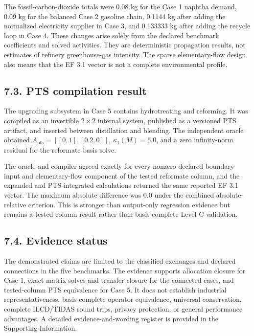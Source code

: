 \documentclass[
  10pt,
  a4paper,
  DIV=11,
  numbers=noendperiod]{scrartcl}
\begin{document}
The fossil-carbon-dioxide totals were 0.08 kg for the Case 1 naphtha
demand, 0.09 kg for the balanced Case 2 gasoline chain, 0.1144 kg after
adding the normalized electricity supplier in Case 3, and 0.133333 kg
after adding the recycle loop in Case 4. These changes arise solely from
the declared benchmark coefficients and solved activities. They are
deterministic propagation results, not estimates of refinery
greenhouse-gas intensity. The sparse elementary-flow design also means
that the EF 3.1 vector is not a complete environmental profile.

\subsection{7.3. PTS compilation result}\label{pts-compilation-result}

The upgrading subsystem in Case 5 contains hydrotreating and reforming.
It was compiled as an invertible \(2\times2\) internal system, published
as a versioned PTS artifact, and inserted between distillation and
blending. The independent oracle obtained
\(A_{\mathrm{pts}}=[[0,1],[0.2,0]]\), \(\kappa_1(M)=5.0\), and a zero
infinity-norm residual for the reformate basis solve.

The oracle and compiler agreed exactly for every nonzero declared
boundary input and elementary-flow component of the tested reformate
column, and the expanded and PTS-integrated calculations returned the
same reported EF 3.1 vector. The maximum absolute difference was 0.0
under the combined absolute-relative criterion. This is stronger than
output-only regression evidence but remains a tested-column result
rather than basis-complete Level C validation.

\subsection{7.4. Evidence status}\label{evidence-status}

The demonstrated claims are limited to the classified exchanges and
declared connections in the five benchmarks. The evidence supports
allocation closure for Case 1, exact matrix solves and transfer closure
for the connected cases, and tested-column PTS equivalence for Case 5.
It does not establish industrial representativeness, basis-complete
operator equivalence, universal conservation, complete ILCD/TIDAS round
trips, privacy protection, or general performance advantages. A detailed
evidence-and-wording register is provided in the Supporting Information.
\end{document}
